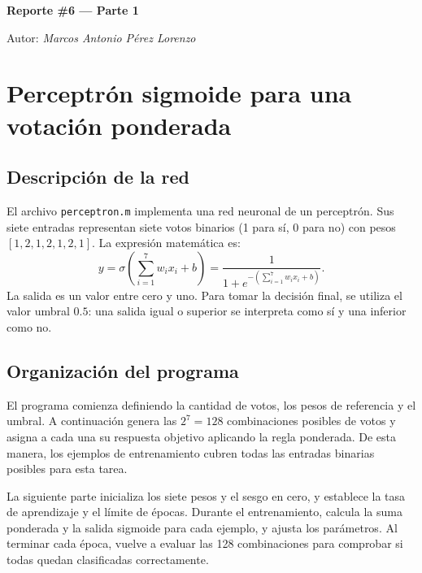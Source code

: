 \documentclass[12pt,a4paper]{article}
\begin{document}
\begin{titlepage}

  \centering
  {\huge\bfseries Reporte \#6 --- Parte 1\par}
	{\Large Autor: \itshape Marcos Antonio Pérez Lorenzo\par}
\end{titlepage}

\pagebreak

\section{Perceptrón sigmoide para una votación ponderada}

\subsection{Descripción de la red}

El archivo \texttt{perceptron.m} implementa una red neuronal de un perceptrón. Sus siete entradas representan siete votos binarios (1 para sí, 0 para no) con pesos \([1,2,1,2,1,2,1]\). La expresión matemática es:
\begin{equation*}
  y = \sigma\!\left(\sum_{i=1}^{7} w_i x_i + b\right)
    = \frac{1}{1 + e^{-\left(\sum_{i=1}^{7} w_i x_i + b\right)}}.
\end{equation*}
La salida es un valor entre cero y uno. Para tomar la decisión final, se utiliza el valor umbral \(0.5\): una salida igual o superior se interpreta como sí y una inferior como no.

\subsection{Organización del programa}

El programa comienza definiendo la cantidad de votos, los pesos de referencia y el umbral. A continuación genera las \(2^7=128\) combinaciones posibles de votos y asigna a cada una su respuesta objetivo aplicando la regla ponderada. De esta manera, los ejemplos de entrenamiento cubren todas las entradas binarias posibles para esta tarea.

La siguiente parte inicializa los siete pesos y el sesgo en cero, y establece la tasa de aprendizaje y el límite de épocas. Durante el entrenamiento, calcula la suma ponderada y la salida sigmoide para cada ejemplo, y ajusta los parámetros. Al terminar cada época, vuelve a evaluar las 128 combinaciones para comprobar si todas quedan clasificadas correctamente.
\end{document}
